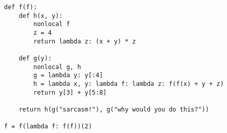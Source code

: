 \hspace*{0in}\begin{minipage}[t]{3in}
\noindent
\begin{numberedprog}{14}{2.5in}
\begin{lstlisting}
def f(f):
    def h(x, y):
        nonlocal f
        z = 4
        return lambda z: (x + y) * z
  
    def g(y):
        nonlocal g, h
        g = lambda y: y[:4]
        h = lambda x, y: lambda f: lambda z: f(f(x) + y + z)
        return y[3] + y[5:8]

    return h(g("sarcasm!"), g("why would you do this?"))

f = f(lambda f: f(f))(2)
\end{lstlisting}
\end{numberedprog}
\end{minipage}
